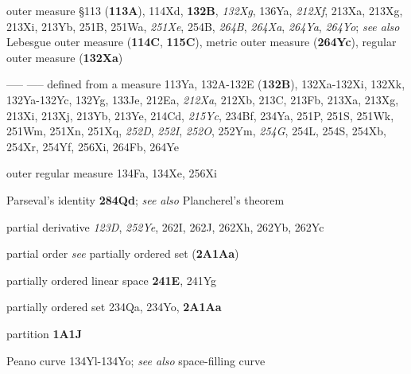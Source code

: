 outer measure \S113 ({\bf 113A}), 114Xd, {\bf 132B}, {\it 132Xg},
136Ya,
  {\it 212Xf}, 213Xa, 213Xg, 213Xi, 213Yb, 251B, 251Wa, {\it 251Xe},
254B, {\it 264B}, {\it 264Xa}, {\it 264Ya}, {\it 264Yo};  
  {\it see also}
Lebesgue outer measure ({\bf 114C}, {\bf 115C}),
metric outer measure ({\bf 264Yc}),
regular outer measure ({\bf 132Xa})

----- ----- defined from a measure 113Ya,
132A-132E ({\bf 132B}), 
132Xa-132Xi, 
132Xk, 132Ya-132Yc, 
132Yg, 133Je,
  212Ea, {\it 212Xa}, 212Xb, 213C, 213Fb, 213Xa, 213Xg, 213Xi, 213Xj,
213Yb, 213Ye, 214Cd, {\it 215Yc}, 234Bf, 234Ya,
251P, 251S, 251Wk, 251Wm, 251Xn,
251Xq, {\it 252D}, {\it 252I}, {\it 252O}, 252Ym,
{\it 254G}, 254L, 254S, 254Xb, 254Xr, 254Yf, 256Xi, 264Fb, 264Ye





outer regular measure 134Fa, 134Xe, 256Xi









\indexmedskip













Parseval's identity {\bf 284Qd};  {\it see also} Plancherel's theorem


partial derivative {\it 123D},
  {\it 252Ye}, 262I, 262J, 262Xh, 262Yb, 262Yc 



partial order
  {\it see} partially ordered set ({\bf 2A1Aa})




partially ordered linear space {\bf 241E}, 241Yg


partially ordered set 234Qa, 234Yo, {\bf 2A1Aa}


partition {\bf 1A1J}





Peano curve 134Yl-134Yo;   
  {\it see also} space-filling curve









